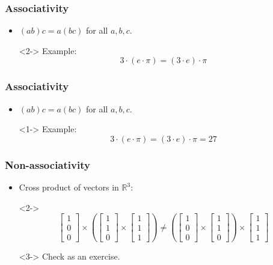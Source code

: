 \documentclass{beamer}
\theoremstyle{definition}
\begin{document}
\begin{frame}
\frametitle{Associativity}
\begin{itemize}
\item $(ab)c=a(bc)$ for all $a,b,c$.
\item[]<2-> Example: \[3\cdot (e\cdot \pi) = (3\cdot e)\cdot \pi\]
\end{itemize}
\end{frame}
\begin{frame}
\frametitle{Associativity}
\begin{itemize}
\item $(ab)c=a(bc)$ for all $a,b,c$.
\item[]<1-> Example: \[3\cdot (e\cdot \pi) = (3\cdot e)\cdot \pi=27\]
\end{itemize}
\end{frame}

\begin{frame}
\frametitle{Non-associativity}
\begin{itemize}
\item<1-> Cross product of vectors in $\mathbb{R}^3$:
\item[]<2-> 
\[
 \begin{bmatrix}
1\\
0\\
0
\end{bmatrix}\times\left(\begin{bmatrix}
1\\
1\\
0
\end{bmatrix} \times \begin{bmatrix}
1\\
1\\
1
\end{bmatrix}\right) \neq \left(\begin{bmatrix}
1\\
0\\
0
\end{bmatrix}\times\begin{bmatrix}
1\\
1\\
0
\end{bmatrix}\right)\times\begin{bmatrix}
1\\
1\\
1
\end{bmatrix}
\]
\item[]<3-> Check as an exercise. %
\end{itemize}


\end{frame}
\end{document}
